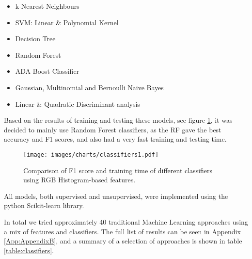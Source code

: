 \documentclass[10pt,a4paper]{article}
\begin{document}
\begin{itemize}
\item k-Nearest Neighbours
\item SVM: Linear \& Polynomial Kernel
\item Decision Tree
\item Random Forest
\item ADA Boost Classifier
\item Gaussian, Multinomial and Bernoulli Naive Bayes
\item Linear \& Quadratic Discriminant analysis
\end{itemize}

Based on the results of training and testing these models, see figure \ref{fig:class_compare}, it was decided to mainly use Random Forest classifiers, as the RF gave the best accuracy and F1 scores, and also had a very fast training and testing time.

\begin{figure}[h]
\begin{framed}
\begin{flushleft}
  \caption{Comparison of F1 score and training time of different classifiers using RGB Histogram-based features.}
  \texttt{[image: images/charts/classifiers1.pdf]}
  \label{fig:class_compare}
  \end{flushleft}
 \end{framed} 
\end{figure}

All models, both supervised and unsupervised, were implemented using the python Scikit-learn library.

In total we tried approximately 40 traditional Machine Learning approaches using a mix of features and classifiers. The full list of results can be seen in Appendix \ref{App:AppendixB}, and a summary of a selection of approaches is shown in table \ref{table:classifiers}.
\end{document}

